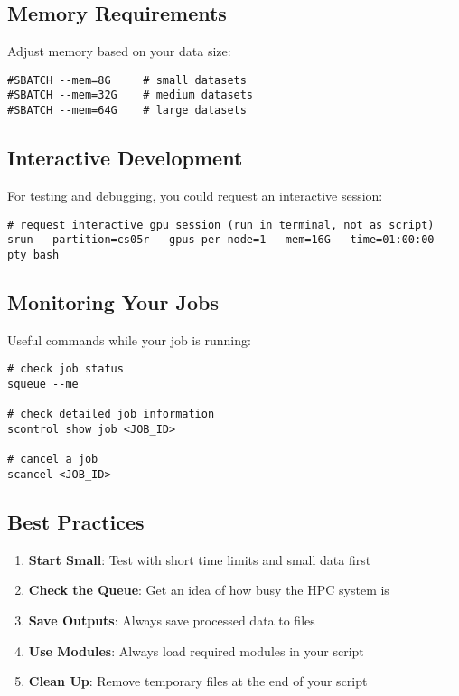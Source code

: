 \documentclass[11pt, a4paper]{article}
\begin{document}
\subsection*{Memory Requirements}

Adjust memory based on your data size:

\begin{lstlisting}
#SBATCH --mem=8G     # small datasets
#SBATCH --mem=32G    # medium datasets
#SBATCH --mem=64G    # large datasets
\end{lstlisting}

\subsection*{Interactive Development}

For testing and debugging, you could request an interactive session:

\begin{lstlisting}
# request interactive gpu session (run in terminal, not as script)
srun --partition=cs05r --gpus-per-node=1 --mem=16G --time=01:00:00 --pty bash
\end{lstlisting}

\subsection*{Monitoring Your Jobs}

Useful commands while your job is running:

\begin{lstlisting}
# check job status
squeue --me

# check detailed job information
scontrol show job <JOB_ID>

# cancel a job
scancel <JOB_ID>
\end{lstlisting}

\subsection*{Best Practices}

\begin{enumerate}
    \item \textbf{Start Small}: Test with short time limits and small data first
    \item \textbf{Check the Queue}: Get an idea of how busy the HPC system is
    \item \textbf{Save Outputs}: Always save processed data to files
    \item \textbf{Use Modules}: Always load required modules in your script
    \item \textbf{Clean Up}: Remove temporary files at the end of your script
\end{enumerate}
\end{document}
